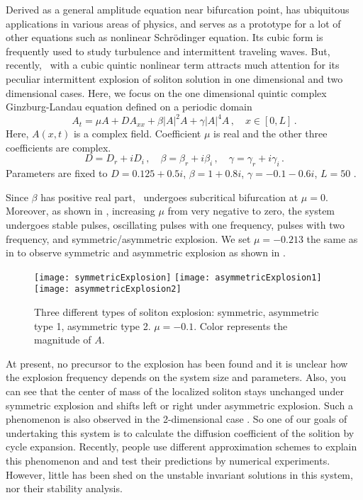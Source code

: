 Derived as a general amplitude equation near bifurcation point,
\cGLe{} has ubiquitous applications
in various areas of physics,
and serves as a prototype for a lot of other equations such as
nonlinear Schr\"odinger equation. Its cubic form is
frequently used to study turbulence and intermittent traveling
waves. But, recently, \cGLe\ with a cubic quintic nonlinear term attracts
much attention for its peculiar intermittent explosion of soliton solution
in one dimensional and two dimensional cases. Here, we focus on
the one dimensional quintic complex Ginzburg-Landau equation defined
on a periodic domain
\begin{equation}
  \label{eq:cqcgl1d}
  A_t = \mu A + DA_{xx} + \beta |A|^2A + \gamma |A|^4A \,,\quad x\in[0,L]
  \,.
\end{equation}
Here, $A(x,t)$ is a complex field. Coefficient $\mu$ is real and
the other three coefficients are complex.
\[
D = D_r + iD_i\,,\quad \beta = \beta_r + i\beta_i\,,\quad
\gamma = \gamma_r + i\gamma_i
\,.
\]
Parameters are fixed to $D=0.125+0.5i$, $\beta=1+0.8i$, $\gamma=-0.1-0.6i$,
$L=50$ .

Since $\beta$ has positive real part, \cqcGLe\ undergoes subcritical
bifurcation at $\mu=0$.  Moreover, as shown in
, increasing
$\mu$ from very negative to zero, the system undergoes stable pulses,
oscillating pulses with one frequency, pulses with two frequency, and
symmetric/asymmetric explosion. We set $\mu=-0.213$
the same as in 
to observe symmetric and
asymmetric explosion as shown in .

\begin{figure}[h]
  \centering
  \texttt{[image: symmetricExplosion]}%
  \texttt{[image: asymmetricExplosion1]}%
  \texttt{[image: asymmetricExplosion2]}
  \caption{Three different types of soliton explosion: symmetric,
  asymmetric type 1, asymmetric type 2. $\mu = -0.1$. Color
  represents the magnitude of $A$.}
  \label{fig:explosionTypes}
\end{figure}
At present, no precursor to the explosion has been found and
it is unclear how the explosion frequency depends on the
system size and parameters. Also, you can see that
the center of mass of the localized
soliton stays unchanged under symmetric explosion and shifts left or right
under asymmetric explosion. Such a phenomenon is also observed in the
2-dimensional case \cite{CaCiDeBr12}.  So one of our goals of
undertaking this system is to calculate the diffusion coefficient
of the solition by cycle expansion. Recently,
people \cite{Descalzi10, Jaime2012, Jaime2013,
Akhmediev04, Orazio2011, CaCiDeBr12}
use different approximation schemes to explain
this phenomenon and and test their predictions by numerical experiments.
However, little has been shed on the unstable invariant solutions in this
system, nor their stability analysis.

